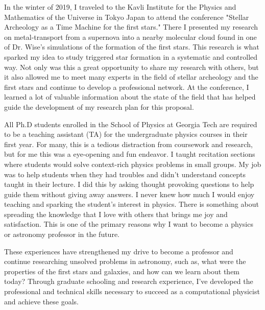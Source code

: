 \documentclass[letterpaper, 12pt]{article}
\begin{document}
In the winter of 2019, I traveled to the Kavli Institute for the Physics and Mathematics of the Universe in Tokyo Japan to attend the conference "Stellar Archeology as a Time Machine for the first stars." There I presented my research on metal-transport from a supernova into a nearby molecular cloud found in one of Dr. Wise's simulations of the formation of the first stars. This research is what sparked my idea to study triggered star formation in a systematic and controlled way. Not only was this a great opportunity to share my research with others, but it also allowed me to meet many experts in the field of stellar archeology and the first stars and continue to develop a professional network. At the conference, I learned a lot of valuable information about the state of the field that has helped guide the development of my research plan for this proposal.

All Ph.D students enrolled in the School of Physics at Georgia Tech are required to be a teaching assistant (TA) for the undergraduate physics courses in their first year. For many, this is a tedious distraction from coursework and research, but for me this was a eye-opening and fun endeavor. I taught recitation sections where students would solve context-rich physics problems in small groups. My job was to help students when they had troubles and didn't understand concepts taught in their lecture. I did this by asking thought provoking questions to help guide them without giving away answers. I never knew how much I would enjoy teaching and sparking the student's interest in physics. There is something about spreading the knowledge that I love with others that brings me joy and satisfaction. This is one of the primary reasons why I want to become a physics or astronomy professor in the future.

These experiences have strengthened my drive to become a professor and continue researching unsolved problems in astronomy, such as, what were the properties of the first stars and galaxies, and how can we learn about them today? Through graduate schooling and research experience, I’ve developed the professional and technical skills necessary to succeed as a computational physicist and achieve these goals.




  
\end{document}
